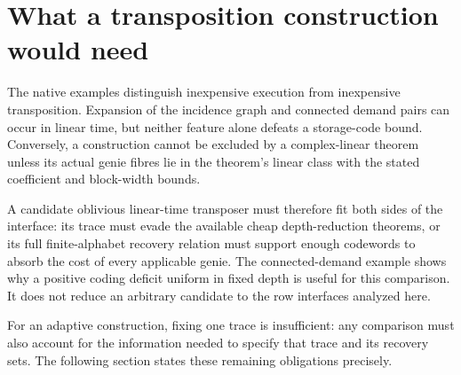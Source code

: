 \section{What a transposition construction would need}\label{sec:construction}

The native examples distinguish inexpensive execution from inexpensive transposition.
Expansion of the incidence graph and connected demand pairs can occur in linear time,
but neither feature alone defeats a storage-code bound. Conversely, a construction
cannot be excluded by a complex-linear theorem unless its actual genie fibres lie in
the theorem's linear class with the stated coefficient and block-width bounds.

A candidate oblivious linear-time transposer must therefore fit both sides of the
interface: its trace must evade the available cheap depth-reduction theorems, or its
full finite-alphabet recovery relation must support enough codewords to absorb the
cost of every applicable genie. The connected-demand example shows why a positive
coding deficit uniform in fixed depth is useful for this comparison. It does not
reduce an arbitrary candidate to the row interfaces analyzed here.

For an adaptive construction, fixing one trace is insufficient: any comparison must
also account for the information needed to specify that trace and its recovery sets.
The following section states these remaining obligations precisely.
